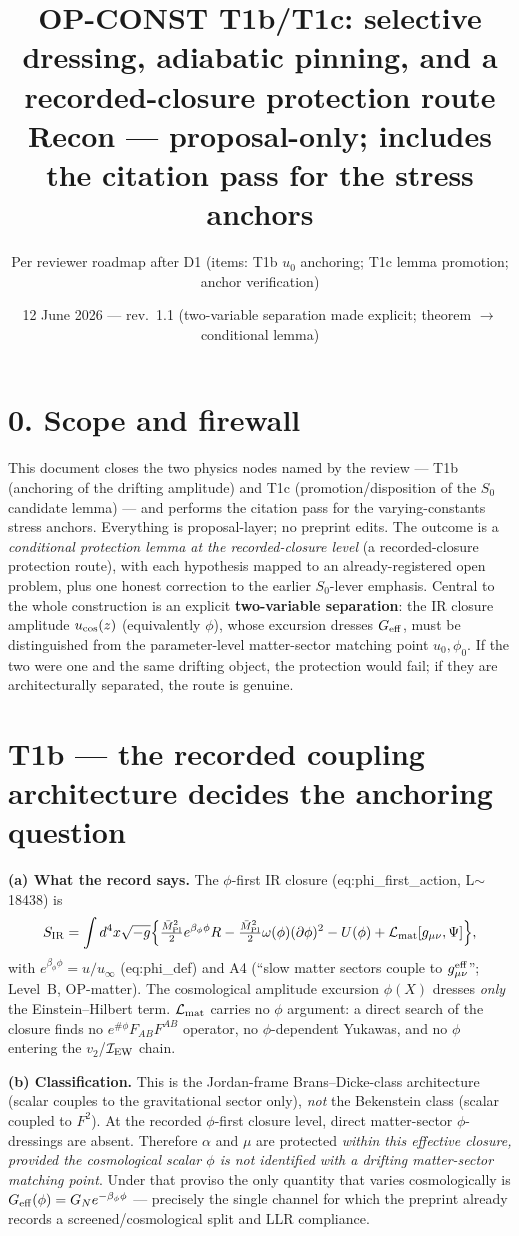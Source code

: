 \documentclass[11pt,a4paper]{article}
\title{\textbf{OP-CONST T1b/T1c: selective dressing, adiabatic pinning, and a
recorded-closure protection route}\\\large Recon --- proposal-only; includes the
citation pass for the stress anchors}
\author{Per reviewer roadmap after D1 (items: T1b $u_0$ anchoring; T1c lemma
promotion; anchor verification)}
\date{12 June 2026 --- rev.~1.1 (two-variable separation made explicit; theorem
$\to$ conditional lemma)}
\begin{document}
\maketitle

\section*{0. Scope and firewall}
This document closes the two physics nodes named by the review --- T1b (anchoring
of the drifting amplitude) and T1c (promotion/disposition of the $S_0$ candidate
lemma) --- and performs the citation pass for the varying-constants stress
anchors. Everything is proposal-layer; no preprint edits. The outcome is a
\emph{conditional protection lemma at the recorded-closure level} (a
recorded-closure protection route), with each hypothesis mapped to an
already-registered open problem, plus one honest correction to the earlier
$S_0$-lever emphasis. Central to the whole construction is an explicit
\textbf{two-variable separation}: the IR closure amplitude $u_{\rm cos}(z)$
(equivalently $\phi$), whose excursion dresses $G_{\rm eff}$, must be
distinguished from the parameter-level matter-sector matching point
$u_0,\phi_0$. If the two were one and the same drifting object, the protection
would fail; if they are architecturally separated, the route is genuine.

\section{T1b --- the recorded coupling architecture decides the anchoring
question}
\textbf{(a) What the record says.} The $\phi$-first IR closure
(eq:phi\_first\_action, L$\sim$18438) is
\[
S_{\rm IR}=\int d^4x\sqrt{-g}\Big\{\tfrac{\bar M_{\rm Pl}^2}{2}e^{\beta_\phi\phi}R
-\tfrac{\bar M_{\rm Pl}^2}{2}\omega(\phi)(\partial\phi)^2-U(\phi)
+\mathcal L_{\rm mat}[g_{\mu\nu},\Psi]\Big\},
\]
with $e^{\beta_\phi\phi}=u/u_\infty$ (eq:phi\_def) and A4 (``slow matter sectors
couple to $g^{\rm eff}_{\mu\nu}$''; Level~B, OP-matter). The cosmological
amplitude excursion $\phi(X)$ dresses \emph{only} the Einstein--Hilbert term.
$\mathcal L_{\rm mat}$ carries no $\phi$ argument: a direct search of the closure
finds no $e^{\#\phi}F_{AB}F^{AB}$ operator, no $\phi$-dependent Yukawas, and no
$\phi$ entering the $v_2$/$\mathcal I_{\rm EW}$ chain.

\textbf{(b) Classification.} This is the Jordan-frame Brans--Dicke-class
architecture (scalar couples to the gravitational sector only), \emph{not} the
Bekenstein class (scalar coupled to $F^2$). At the recorded $\phi$-first closure
level, direct matter-sector $\phi$-dressings are absent. Therefore $\alpha$ and
$\mu$ are protected \emph{within this effective closure,
provided the cosmological scalar $\phi$ is not identified with a drifting
matter-sector matching point}. Under that proviso the only quantity that varies cosmologically
is $G_{\rm eff}(\phi)=G_N e^{-\beta_\phi\phi}$ --- precisely the single channel
for which the preprint already records a screened/cosmological split and LLR
compliance.
\end{document}
